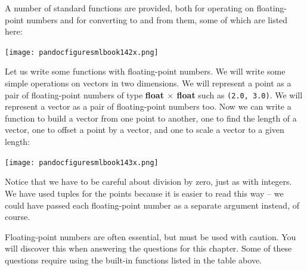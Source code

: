 \documentclass[]{book}
\begin{document}
A number of standard functions are provided, both for operating on floating-point numbers and for converting to and from them, some of which are listed here:

\medskip
\begin{center}
\noindent\texttt{[image: pandocfiguresmlbook142x.png]}
\end{center}
\medskip

\noindent Let us write some functions with floating-point numbers. We will write some simple operations on vectors in two dimensions. We will represent a point as a pair of floating-point numbers of type \textsf{\textbf{float $\times$ float}} such as \texttt{(2.0, 3.0)}. We will represent a vector as a pair of floating-point numbers too. Now we can write a function to build a vector from one point to another, one to find the length of a vector, one to offset a point by a vector, and one to scale a vector to a given length:

\medskip
\begin{center}
\noindent\texttt{[image: pandocfiguresmlbook143x.png]}
\end{center}
\medskip

\noindent Notice that we have to be careful about division by zero, just as with integers. We have used tuples for the points because it is easier to read this way -- we could have passed each floating-point number as a separate argument instead, of course.

Floating-point numbers are often essential, but must be used with caution. You will discover this when answering the questions for this chapter. Some of these questions require using the built-in functions listed in the table above.

\clearpage
\end{document}
